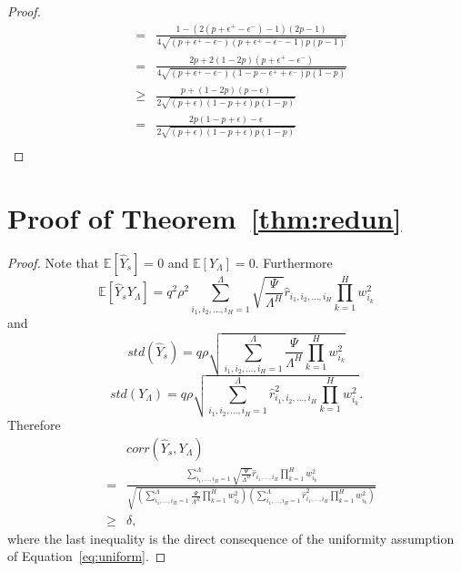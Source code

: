 \documentclass[twoside]{article}
\begin{document}
\begin{proof}
\begin{eqnarray*}
&=& \frac{1 - (2(p + \epsilon^{+} - \epsilon^{-}) - 1)(2p-1)}{4\sqrt{(p + \epsilon^{+} - \epsilon^{-})(p + \epsilon^{+} - \epsilon^{-} - 1)p(p-1)}}\\
&=& \frac{2p + 2(1-2p)(p + \epsilon^{+} - \epsilon^{-})}{4\sqrt{(p + \epsilon^{+} - \epsilon^{-})(1 - p - \epsilon^{+} + \epsilon^{-})p(1 - p)}}\\
&\geq& \frac{p + (1-2p)(p - \epsilon)}{2\sqrt{(p + \epsilon)(1 - p + \epsilon)p(1 - p)}}\\
&=& \frac{2p(1 - p + \epsilon) - \epsilon}{2\sqrt{(p + \epsilon)(1 - p + \epsilon)p(1 - p)}}\\
\end{eqnarray*}
\end{proof}

\section{Proof of Theorem~\ref{thm:redun}}
\begin{proof}
Note that $\mathbb{E}[\hat{Y}_s] = 0$ and $\mathbb{E}[Y_{\Lambda}] = 0$. Furthermore
\[\mathbb{E}[\hat{Y}_sY_{\Lambda}] = q^2\rho^2\sum_{i_1,i_2,\dots,i_H=1}^{\Lambda}\sqrt{\frac{\Psi}{\Lambda^H}}\hat{r}_{i_1,i_2,\dots,i_H}\prod_{k = 1}^{H}w_{i_k}^2
\]
and
\[std(\hat{Y}_s) = q\rho\sqrt{\sum_{i_1,i_2,\dots,i_H=1}^{\Lambda}\frac{\Psi}{\Lambda^H}\prod_{k = 1}^{H}w_{i_k}^2}
\]
\[std(Y_{\Lambda}) = q\rho\sqrt{\sum_{i_1,i_2,\dots,i_H=1}^{\Lambda}\hat{r}_{i_1,i_2,\dots,i_H}^2\prod_{k = 1}^{H}w_{i_k}^2}.
\]
Therefore
\begin{eqnarray*}
&&\!\!\!\!\!\!\!\!\!corr(\hat{Y}_s,Y_{\Lambda})\\ 
&\!\!\!\!\!\!\!\!\!=&\!\!\!\!\!\!\! \frac{\displaystyle\sum_{i_1,\dots,i_H=1}^{\Lambda}\sqrt{\frac{\Psi}{\Lambda^H}}\hat{r}_{i_1,\dots,i_H}\prod_{k = 1}^{H}w_{i_k}^2}{\sqrt{\!\!\!\left(\displaystyle\sum_{i_1,\dots,i_H=1}^{\Lambda}\frac{\Psi}{\Lambda^H}\prod_{k = 1}^{H}w_{i_k}^2\right)\!\!\!\!\left(\displaystyle\sum_{i_1,\dots,i_H=1}^{\Lambda}\!\!\!\!\!\hat{r}_{i_1,\dots,i_H}^2\prod_{k = 1}^{H}w_{i_k}^2\right)}}\\
&\!\!\!\!\!\!\!\!\geq& \delta, 
\end{eqnarray*}
where the last inequality is the direct consequence of the uniformity assumption of Equation~\ref{eq:uniform}.
\end{proof}
\end{document}
